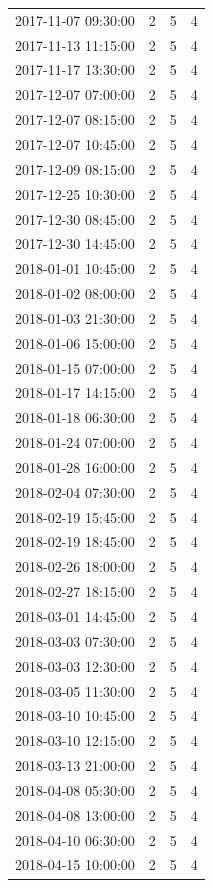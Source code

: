 \begin{tabular}{lrrr}
2017-11-07 09:30:00 & 2 & 5 & 4 \\
2017-11-13 11:15:00 & 2 & 5 & 4 \\
2017-11-17 13:30:00 & 2 & 5 & 4 \\
2017-12-07 07:00:00 & 2 & 5 & 4 \\
2017-12-07 08:15:00 & 2 & 5 & 4 \\
2017-12-07 10:45:00 & 2 & 5 & 4 \\
2017-12-09 08:15:00 & 2 & 5 & 4 \\
2017-12-25 10:30:00 & 2 & 5 & 4 \\
2017-12-30 08:45:00 & 2 & 5 & 4 \\
2017-12-30 14:45:00 & 2 & 5 & 4 \\
2018-01-01 10:45:00 & 2 & 5 & 4 \\
2018-01-02 08:00:00 & 2 & 5 & 4 \\
2018-01-03 21:30:00 & 2 & 5 & 4 \\
2018-01-06 15:00:00 & 2 & 5 & 4 \\
2018-01-15 07:00:00 & 2 & 5 & 4 \\
2018-01-17 14:15:00 & 2 & 5 & 4 \\
2018-01-18 06:30:00 & 2 & 5 & 4 \\
2018-01-24 07:00:00 & 2 & 5 & 4 \\
2018-01-28 16:00:00 & 2 & 5 & 4 \\
2018-02-04 07:30:00 & 2 & 5 & 4 \\
2018-02-19 15:45:00 & 2 & 5 & 4 \\
2018-02-19 18:45:00 & 2 & 5 & 4 \\
2018-02-26 18:00:00 & 2 & 5 & 4 \\
2018-02-27 18:15:00 & 2 & 5 & 4 \\
2018-03-01 14:45:00 & 2 & 5 & 4 \\
2018-03-03 07:30:00 & 2 & 5 & 4 \\
2018-03-03 12:30:00 & 2 & 5 & 4 \\
2018-03-05 11:30:00 & 2 & 5 & 4 \\
2018-03-10 10:45:00 & 2 & 5 & 4 \\
2018-03-10 12:15:00 & 2 & 5 & 4 \\
2018-03-13 21:00:00 & 2 & 5 & 4 \\
2018-04-08 05:30:00 & 2 & 5 & 4 \\
2018-04-08 13:00:00 & 2 & 5 & 4 \\
2018-04-10 06:30:00 & 2 & 5 & 4 \\
2018-04-15 10:00:00 & 2 & 5 & 4 \\

\end{tabular}
